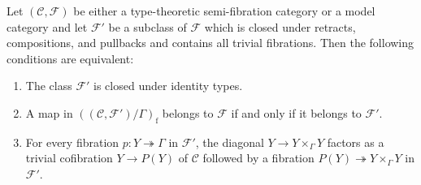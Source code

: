 \documentclass[reqno]{amsart}
\theoremstyle{definition}
\theoremstyle{remark}
\newcommand{\fs}[1]{\mathrm{#1}}
\newcommand{\scat}[1]{\mathcal{#1}}
\newcommand{\Fib}{\mathcal{F}}
\numberwithin{figure}{section}
\begin{document}
\begin{lem}
Let $(\scat{C},\Fib)$ be either a type-theoretic semi-fibration category or a model category and let $\Fib'$ be a subclass of $\Fib$ which is closed under retracts, compositions, and pullbacks and contains all trivial fibrations.
Then the following conditions are equivalent:
\begin{enumerate}
\item \label{it:subfib-model-id} The class $\Fib'$ is closed under identity types.
\item \label{it:subfib-model-fib} A map in $((\scat{C},\Fib')/\Gamma)_\fs{f}$ belongs to $\Fib$ if and only if it belongs to $\Fib'$.
\item \label{it:subfib-model-path} For every fibration $p : Y \twoheadrightarrow \Gamma$ in $\Fib'$,
the diagonal $Y \to Y \times_\Gamma Y$ factors as a trivial cofibration $Y \to P(Y)$ of $\scat{C}$ followed by a fibration $P(Y) \twoheadrightarrow Y \times_\Gamma Y$ in $\Fib'$.
\end{enumerate}
\end{lem}
\end{document}
